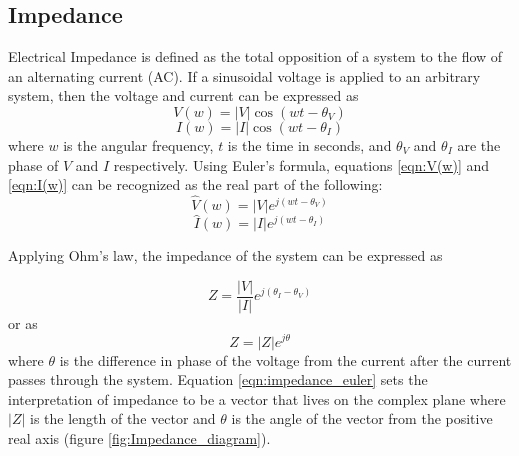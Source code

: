  \subsection*{Impedance}
 \par Electrical Impedance is defined as the total opposition of a system to the flow of an alternating current (AC). If a sinusoidal voltage is applied to an arbitrary system, then the voltage and current can be expressed as
 \begin{equation}
    V(w) = |V|\cos(wt-\theta_V)
    \label{eqn:V(w)}
 \end{equation}
 \begin{equation}
    I(w) = |I|\cos(wt - \theta_I)
    \label{eqn:I(w)}
 \end{equation}
 \noindent where $w$ is the angular frequency, $t$ is the time in seconds, and $\theta_V$ and $\theta_I$ are the phase of $V$ and $I$ respectively. Using Euler's formula, equations \ref{eqn:V(w)} and \ref{eqn:I(w)} can be recognized as the real part of the following:
 \begin{equation}
    \hat{V}(w) = |V|e^{j(wt-\theta_V)}
 \end{equation}
 \begin{equation}
     \hat{I}(w) = |I|e^{j(wt-\theta_I)}
 \end{equation}
 
 \par Applying Ohm's law, the impedance of the system can be expressed as
 
 \begin{equation}
    Z = \frac{|V|}{|I|}e^{j(\theta_I-\theta_V)}
 \end{equation}
 \noindent or as 
 \begin{equation}
     Z = |Z|e^{j\theta}
     \label{eqn:impedance_euler}
 \end{equation}
 \noindent where $\theta$ is the difference in phase of the voltage from the current after the current passes through the system. Equation \ref{eqn:impedance_euler} sets the interpretation of impedance to be a vector that lives on the complex plane where $|Z|$ is the length of the vector and $\theta$ is the angle of the vector from the positive real axis (figure \ref{fig:Impedance_diagram}).
 
